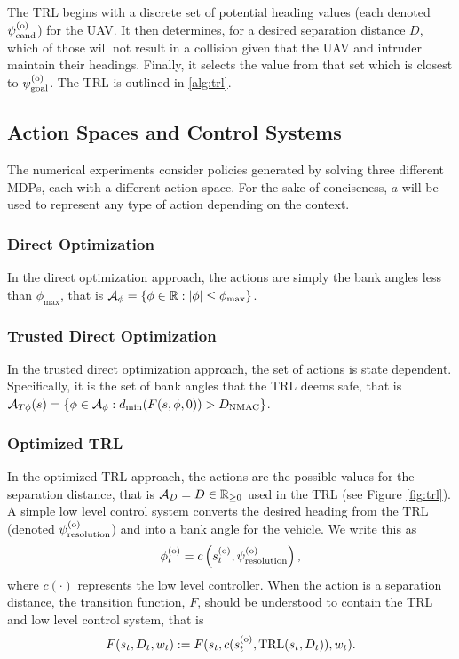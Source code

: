 The TRL begins with a discrete set of potential heading values (each denoted $\psi^{(\mathrm{o})}_{\mathrm{cand}}$) for the UAV. It then determines, for a desired separation distance $D$,  which of those will not result in a collision given that the UAV and  intruder maintain their headings. Finally, it selects the value from that set which is closest to $\psi^{(\mathrm{o})}_\mathrm{goal}$. The TRL is outlined in \cref{alg:trl}.

\subsection{Action Spaces and Control Systems}\label{sec:aspaces}

The numerical experiments consider policies generated by solving three different MDPs, each with a different action space. 
For the sake of conciseness, $a$ will be used to represent any type of action depending on the context.

\subsubsection{Direct Optimization}

In the direct optimization approach, the actions are simply the bank angles less than $\phi_\text{max}$, that is ${\mathcal{A}}_\phi = \left\{\phi \in \mathbb{R}: |\phi| \leq \phi_\text{max} \right\}$.

\subsubsection{Trusted Direct Optimization}

In the trusted direct optimization approach, the set of actions is state dependent.
Specifically, it is the set of bank angles that the TRL deems safe, that is ${\mathcal{A}}_{T\phi}(s) = \left\{\phi \in {\ensuremath{\mathcal{A}}}_\phi: d_\text{min}(F(s, \phi, 0)) > D_\text{NMAC} \right\}$.

\subsubsection{Optimized TRL}

In the optimized TRL approach, the actions are the possible values for the separation distance, that is ${\mathcal{A}}_{D} = D\in \mathbb{R}_{\geq 0}$ used in the TRL (see Figure \ref{fig:trl}).
A simple low level control system converts the desired heading from the TRL (denoted $\psi^{(\mathrm{o})}_\mathrm{resolution}$) and into a bank angle for the vehicle.
We write this as
\begin{equation}
    \phi^{(\mathrm{o})}_t = c\left(s^{(\mathrm{o})}_t, \psi^{(\mathrm{o})}_\mathrm{resolution} \right) \text{,}
\end{equation}
where $c(\cdot)$ represents the low level controller.
When the action is a separation distance, the transition function, $F$, should be understood to contain the TRL and low level control system, that is
\begin{equation}
    F(s_t, D_t, w_t) := F(s_t, c(s^{(\mathrm{o})}_t, \text{TRL}(s_t, D_t)), w_t) \text{.}
\end{equation}

